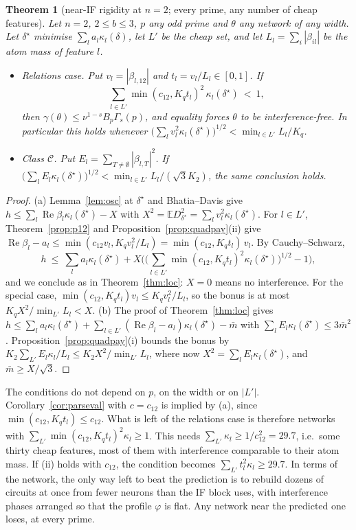 \documentclass[11pt]{article}
\newtheorem{theorem}{Theorem}
\theoremstyle{definition}
\renewcommand{\Re}{\operatorname{Re}}
\begin{document}
\begin{theorem}[near-IF rigidity at $n=2$; every prime, any number of cheap features]\label{thm:nearif}
Let $n=2$, $2\le b\le3$, $p$ any odd prime and $\theta$ any network of any width.  Let $\delta^\star$ minimise $\sum_la_l\kappa_l(\delta)$, let $L'$ be the cheap set, and let
$L_l=\sum_i|\beta_{il}|$ be the atom mass of feature $l$.
\begin{itemize}
\item[(a)] \emph{Relations case.}  Put $v_l=|\beta_{l,12}|$ and $t_l=v_l/L_l\in[0,1]$.  If
\[\sum_{l\in L'}\min(c_{12},K_qt_l)^2\,\kappa_l(\delta^\star)\ <\ 1,\]
then $\gamma(\theta)\le\nu^{1-s}B_p\Gamma_s(p)$, and equality forces $\theta$ to be interference-free.  In particular this holds whenever
$\big(\sum_lv_l^2\kappa_l(\delta^\star)\big)^{1/2}<\min_{l\in L'}L_l/K_q$.
\item[(b)] \emph{Class $\mathcal C$.}  Put $E_l=\sum_{T\ne\emptyset}|\beta_{l,T}|^2$.  If $\big(\sum_lE_l\kappa_l(\delta^\star)\big)^{1/2}<\min_{l\in L'}L_l/(\sqrt3K_2)$, the same conclusion holds.
\end{itemize}
\end{theorem}
\begin{proof}
(a) Lemma~\ref{lem:osc} at $\delta^\star$ and Bhatia--Davis give $h\le\sum_l\Re\beta_l\kappa_l(\delta^\star)-X$ with $X^2=\mathbb ED_{\delta^\star}^2=\sum_lv_l^2\kappa_l(\delta^\star)$.  For $l\in L'$,
Theorem~\ref{prop:p12} and Proposition~\ref{prop:quadpay}(ii) give $\Re\beta_l-a_l\le\min(c_{12}v_l,K_qv_l^2/L_l)=\min(c_{12},K_qt_l)\,v_l$.  By Cauchy--Schwarz,
\[h\ \le\ \sum_la_l\kappa_l(\delta^\star)+X\Big(\big(\textstyle\sum_{l\in L'}\min(c_{12},K_qt_l)^2\kappa_l(\delta^\star)\big)^{1/2}-1\Big),\]
and we conclude as in Theorem~\ref{thm:loc}: $X=0$ means no interference.  For the special case, $\min(c_{12},K_qt_l)v_l\le K_qv_l^2/L_l$, so the bonus is at most $K_qX^2/\min_{L'}L_l<X$.
(b) The proof of Theorem~\ref{thm:loc} gives $h\le\sum_la_l\kappa_l(\delta^\star)+\sum_{l\in L'}(\Re\beta_l-a_l)\kappa_l(\delta^\star)-\bar m$ with $\sum_lE_l\kappa_l(\delta^\star)\le3\bar m^2$.
Proposition~\ref{prop:quadpay}(i) bounds the bonus by $K_2\sum_{L'}E_l\kappa_l/L_l\le K_2X^2/\min_{L'}L_l$, where now $X^2=\sum_lE_l\kappa_l(\delta^\star)$, and $\bar m\ge X/\sqrt3$.
\end{proof}
The conditions do not depend on $p$, on the width or on $|L'|$.  Corollary~\ref{cor:parseval} with $c=c_{12}$ is implied by (a), since $\min(c_{12},K_qt_l)\le c_{12}$.  What is left of the
relations case is therefore networks with $\sum_{L'}\min(c_{12},K_qt_l)^2\kappa_l\ge1$.  This needs $\sum_{L'}\kappa_l\ge1/c_{12}^2=29.7$, i.e.\ some thirty cheap
features, most of them with interference comparable to their atom mass.  If (ii) holds with $c_{12}$, the condition becomes $\sum_{L'}t_l^2\kappa_l\ge29.7$.  In terms of the network, the
only way left to beat the prediction is to rebuild dozens of circuits at once from fewer neurons than the IF block uses, with interference phases
arranged so that the profile $\varphi$ is flat.  Any network near the predicted one loses, at every prime.
\end{document}
